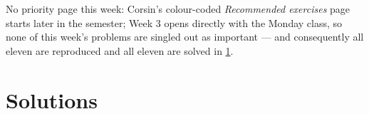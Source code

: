 \begin{ainote}
No priority page this week: Corsin's colour-coded \textit{Recommended exercises} page starts
later in the semester; Week 3 opens directly with the Monday class, so none of this week's
problems are singled out as important --- and consequently all eleven are reproduced and all
eleven are solved in \cref{sec:week03_solutions}.
\end{ainote}



\section{Solutions}
\label{sec:week03_solutions}


